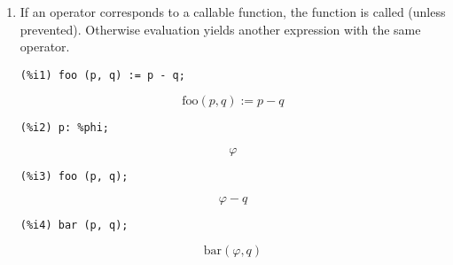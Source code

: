 \documentclass[12pt,leqno]{article}
\begin{document}
\begin{enumerate}
\item If an operator corresponds to a callable function,
the function is called (unless prevented).
Otherwise evaluation yields another expression with the same operator.
\begin{verbatim}
(%i1) foo (p, q) := p - q;
\end{verbatim}
\begin{equation}
\mathrm{foo}\left(p , q\right):=p-q\tag{\%o1}
\label{eq:doc-group1-code14-1-1}
\end{equation}
\begin{verbatim}
(%i2) p: %phi;
\end{verbatim}
\begin{equation}
\varphi \tag{\%o2}
\label{eq:doc-group1-code14-2-1}
\end{equation}
\begin{verbatim}
(%i3) foo (p, q);
\end{verbatim}
\begin{equation}
\varphi -q\tag{\%o3}
\label{eq:doc-group1-code14-3-1}
\end{equation}
\begin{verbatim}
(%i4) bar (p, q);
\end{verbatim}
\begin{equation}
\mathrm{bar}\left(\varphi  , q\right)\tag{\%o4}
\label{eq:doc-group1-code14-4-1}
\end{equation}



\end{enumerate}
\end{document}
